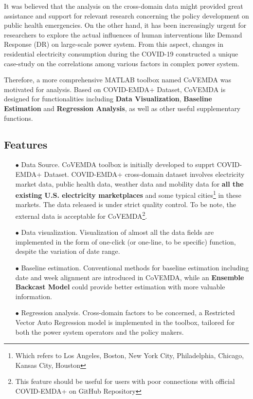 \documentclass[11pt]{article}
\numberwithin{equation}{section}
\numberwithin{table}{section}
\numberwithin{figure}{section}
\begin{document}
It was believed that the analysis on the cross-domain data might provided great assistance and support for relevant research concerning the policy development on public health emergencies. On the other hand, it has been increasingly urgent for researchers to explore the actual influences of human interventions like Demand Response (DR) on large-scale power system. From this aspect, changes in residential electricity consumption during the COVID-19 constructed a unique case-study on the correlations among various factors in complex power system.

Therefore, a more comprehensive MATLAB toolbox named CoVEMDA was motivated for analysis. Based on COVID-EMDA+ Dataset, CoVEMDA is designed for functionalities including \textbf{Data Visualization}, \textbf{Baseline Estimation} and \textbf{Regression Analysis}, as well as other useful supplementary functions.
\subsection{Features}
\begin{itemize}
    \item[$\bullet$] Data Source. CoVEMDA toolbox is initially developed to supprt COVID-EMDA+ Dataset. COVID-EMDA+ cross-domain dataset involves electricity market data, public health data, weather data and mobility data for \textbf{all the existing U.S. electricity marketplaces} and some typical cities\footnote{Which refers to Los Angeles, Boston, New York City, Philadelphia, Chicago, Kansas City, Houston} in these markets. The data released is under strict quality control. To be note, the external data is acceptable for CoVEMDA\footnote{This feature should be useful for users with poor connections with official COVID-EMDA+ on GitHub Repository}.
    \item[$\bullet$] Data visualization. Visualization of almost all the data fields are implemented in the form of one-click (or one-line, to be specific) function, despite the variation of date range.
    \item[$\bullet$] Baseline estimation. Conventional methods for baseline estimation including date and week alignment are introduced in CoVEMDA, while an \textbf{Ensemble Backcast Model} could provide better estimation with more valuable information.
    \item[$\bullet$] Regression analysis. Cross-domain factors to be concerned, a Restricted Vector Auto Regression model is implemented in the toolbox, tailored for both the power system operators and the policy makers.
\end{itemize}
\end{document}
